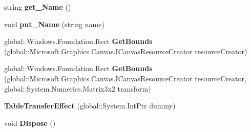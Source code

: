 \begin{DoxyCompactItemize}
\item 
\mbox{\label{class_microsoft_1_1_graphics_1_1_canvas_1_1_effects_1_1_table_transfer_effect_aaea984b6bd7308873e3cb30f37df354f}} 
string {\bfseries get\+\_\+\+Name} ()
\item 
\mbox{\label{class_microsoft_1_1_graphics_1_1_canvas_1_1_effects_1_1_table_transfer_effect_ab3ddf2e399cb1acbd782f786aaacc579}} 
void {\bfseries put\+\_\+\+Name} (string name)
\item 
\mbox{\label{class_microsoft_1_1_graphics_1_1_canvas_1_1_effects_1_1_table_transfer_effect_a1837f2092a2f7df44f26878cf6531baa}} 
global\+::\+Windows.\+Foundation.\+Rect {\bfseries Get\+Bounds} (global\+::\+Microsoft.\+Graphics.\+Canvas.\+I\+Canvas\+Resource\+Creator resource\+Creator)
\item 
\mbox{\label{class_microsoft_1_1_graphics_1_1_canvas_1_1_effects_1_1_table_transfer_effect_a5a75b3c4d1c9d7dc01364dfbe795eb03}} 
global\+::\+Windows.\+Foundation.\+Rect {\bfseries Get\+Bounds} (global\+::\+Microsoft.\+Graphics.\+Canvas.\+I\+Canvas\+Resource\+Creator resource\+Creator, global\+::\+System.\+Numerics.\+Matrix3x2 transform)
\item 
\mbox{\label{class_microsoft_1_1_graphics_1_1_canvas_1_1_effects_1_1_table_transfer_effect_a00f1866e148048c12db7d9cd6835a5c6}} 
{\bfseries Table\+Transfer\+Effect} (global\+::\+System.\+Int\+Ptr dummy)
\item 
\mbox{\label{class_microsoft_1_1_graphics_1_1_canvas_1_1_effects_1_1_table_transfer_effect_a34a02a0b9d09bae4a46a7fa153f37403}} 
void {\bfseries Dispose} ()
\item 
\mbox{\label{class_microsoft_1_1_graphics_1_1_canvas_1_1_effects_1_1_table_transfer_effect_acc0161603fda92199b24a968798dd935}} 

\end{DoxyCompactItemize}
